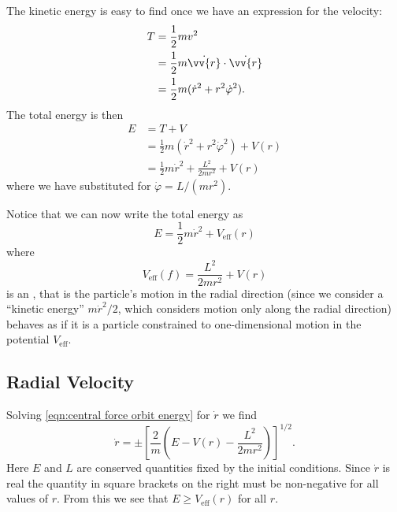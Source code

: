 \documentclass[fleqn]{NotesClass}
\newcommand*{\eff}{\mathrm{eff}}
\begin{document}
    The kinetic energy is easy to find once we have an expression for the velocity:
    \begin{align}
        T &= \frac{1}{2}mv^2\\
        &= \frac{1}{2}m\dot{\vv{r}}\cdot\dot{\vv{r}}\\
        &= \frac{1}{2}m(\dot{r}^2 + r^2\dot{\varphi}^2).
    \end{align}
    The total energy is then
    \begin{align}
        E &= T + V\\
        &= \frac{1}{2}m(\dot{r}^2 + r^2\dot{\varphi}^2) + V(r)\\
        &= \frac{1}{2}m\dot{r}^2 + \frac{L^2}{2mr^2} + V(r)\label{eqn:central force orbit energy}
    \end{align}
    where we have substituted for \(\dot{\varphi} = L/(mr^2)\).
    
    Notice that we can now write the total energy as
    \begin{equation}
        E = \frac{1}{2}m\dot{r}^2 + V_\eff(r)
    \end{equation}
    where
    \begin{equation}
        V_{\eff}(f) = \frac{L^2}{2mr^2} + V(r)
    \end{equation}
    is an , that is the particle's motion in the radial direction (since we consider a \enquote{kinetic energy} \(m\dot{r}^2/2\), which considers motion only along the radial direction) behaves as if it is a particle constrained to one-dimensional motion in the potential \(V_\eff\).
    
    \subsection{Radial Velocity}
    Solving \cref{eqn:central force orbit energy} for \(\dot{r}\) we find
    \begin{equation}\label{eqn:central potential radial velocity}
        \dot{r} = \pm \left[ \frac{2}{m}\left( E - V(r) - \frac{L^2}{2mr^2} \right) \right]^{1/2}.
    \end{equation}
    Here \(E\) and \(L\) are conserved quantities fixed by the initial conditions.
    Since \(\dot{r}\) is real the quantity in square brackets on the right must be non-negative for all values of \(r\).
    From this we see that \(E \ge V_{\eff}(r)\) for all \(r\).
    
\end{document}
